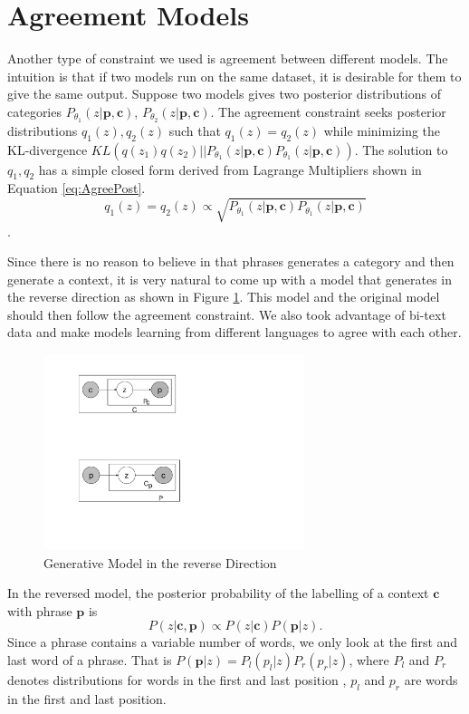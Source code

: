 \section{Agreement Models}\label{sec:pr-agree}

Another type of constraint we used is agreement between
different models. The intuition is that if two models run
on the same dataset, it is desirable for them to give the same 
output. Suppose two models gives two posterior 
distributions of categories
$P_{\theta_1}(z|\textbf{p},\textbf{c})$,
$P_{\theta_2}(z|\textbf{p},\textbf{c})$. The
agreement constraint seeks posterior distributions
$q_1(z),q_2(z)$
such that $q_1(z)=q_2(z)$ while minimizing
the KL-divergence
$KL(q(z_1)q(z_2)||
P_{\theta_1}(z|\textbf{p},\textbf{c})
P_{\theta_1}(z|\textbf{p},\textbf{c}))$.
The solution to $q_1,q_2$ has a simple closed
form derived from Lagrange Multipliers shown in
Equation \ref{eq:AgreePost}.
\begin{equation}\label{eq:AgreePost}
q_1(z)=q_2(z)\propto 
\sqrt{P_{\theta_1}(z|\textbf{p},\textbf{c})
P_{\theta_1}(z|\textbf{p},\textbf{c})}
\end{equation}.

Since there is no reason to believe in that
phrases generates a category and then generate
a context, it is very natural to come up with a model
that generates in the reverse direction
as shown in Figure \ref{fig:EMreverse}. This model
and the original model should then follow the agreement 
constraint.
We also
took advantage of bi-text data and make models
learning from different languages to
agree with each other.

\begin{figure}[h]
  \centering
  \includegraphics[width=3.0in]{pr-clustering/EMreverse}
  \caption{Generative Model in the reverse Direction}
  \label{fig:EMreverse}
\end{figure}

In the reversed model,
the posterior probability of the labelling of
a context $\textbf{c}$ with
phrase $\textbf{p}$ is 
\[
P(z|\textbf{c},\textbf{p})\propto 
P(z|\textbf{c})P(\textbf{p}|z).
\]
Since a phrase contains a variable number of words,
we only look at the first and last word of
a phrase. That is $P(\textbf{p}|z)=P_l(p_l|z)P_r(p_r|z)$,
where $P_l$ and $P_r$
denotes distributions for words in the first and last position
, $p_l$ and $p_r$ are words in the first and last position.

